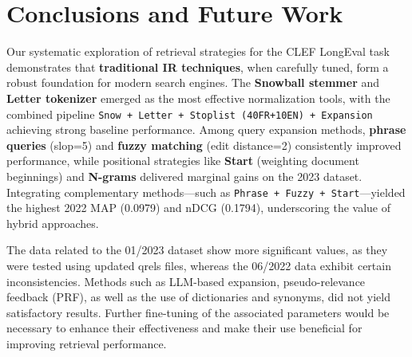 \section{Conclusions and Future Work}
\label{sec:conclusion}

Our systematic exploration of retrieval strategies for the CLEF LongEval task demonstrates that \textbf{traditional IR techniques}, when carefully tuned, form a robust foundation for modern search engines. The \textbf{Snowball stemmer} and \textbf{Letter tokenizer} emerged as the most effective normalization tools, with the combined pipeline \texttt{Snow + Letter + Stoplist (40FR+10EN) + Expansion} achieving strong baseline performance. Among query expansion methods, \textbf{phrase queries} (slop=5) and \textbf{fuzzy matching} (edit distance=2) consistently improved performance, while positional strategies like \textbf{Start} (weighting document beginnings) and \textbf{N-grams} delivered marginal gains on the 2023 dataset. Integrating complementary methods---such as \texttt{Phrase + Fuzzy + Start}---yielded the highest 2022 MAP (0.0979) and nDCG (0.1794), underscoring the value of hybrid approaches.
\vspace{1\baselineskip}

The data related to the 01/2023 dataset show more significant values, as they were tested using updated qrels files, whereas the 06/2022 data exhibit certain inconsistencies.
Methods such as LLM-based expansion, pseudo-relevance feedback (PRF), as well as the use of dictionaries and synonyms, did not yield satisfactory results. Further fine-tuning of the associated parameters would be necessary to enhance their effectiveness and make their use beneficial for improving retrieval performance.